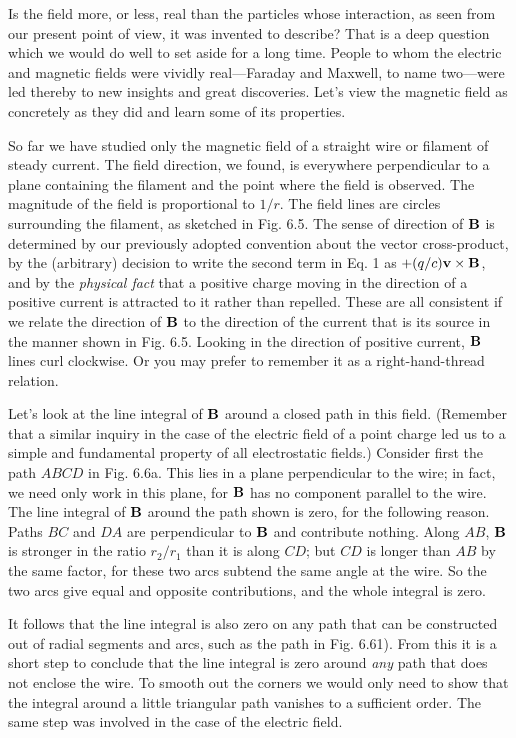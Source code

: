 Is the field more, or less, real than the particles whose interaction,
as seen from our present point of view, it was invented to describe?
That is a deep question which we would do well to set aside for a long
time. People to whom the electric and magnetic fields were vividly
real---Faraday and Maxwell, to name two---were led thereby to new
insights and great discoveries. Let's view the magnetic field as concretely
as they did and learn some of its properties.


So far we have studied only the magnetic field of a straight wire
or filament of steady current. The field direction, we found, is everywhere
perpendicular to a plane containing the filament and the point
where the field is observed. The magnitude of the field is proportional
to $1/r$. The field lines are circles surrounding the filament, as
sketched in Fig. 6.5. The sense of direction of $\mathbf{B}$ is determined by our
previously adopted convention about the vector cross-product, by
the (arbitrary) decision to write the second term in Eq. 1 as
$+ (q/c) \mathbf{v} \times \mathbf{B}$, and by the \emph{physical fact} that a positive charge moving
in the direction of a positive current is attracted to it rather than
repelled. These are all consistent if we relate the direction of $\mathbf{B}$ to
the direction of the current that is its source in the manner shown
in Fig. 6.5. Looking in the direction of positive current, $\mathbf{B}$ lines curl
clockwise. Or you may prefer to remember it as a right-hand-thread
relation.

Let's look at the line integral of $\mathbf{B}$ around a closed path in this field.
(Remember that a similar inquiry in the case of the electric field of
a point charge led us to a simple and fundamental property of all
electrostatic fields.) Consider first the path $ABCD$ in Fig. 6.6a. This
lies in a plane perpendicular to the wire; in fact, we need only work
in this plane, for $\mathbf{B}$ has no component parallel to the wire. The line
integral of $\mathbf{B}$ around the path shown is zero, for the following reason.
Paths $BC$ and $DA$ are perpendicular to $\mathbf{B}$ and contribute nothing.
Along $AB$, $\mathbf{B}$ is stronger in the ratio $r_2/r_1$ than it is along $CD$; but $CD$
is longer than $AB$ by the same factor, for these two arcs subtend the
same angle at the wire. So the two arcs give equal and opposite 
contributions, and the whole integral is zero.

It follows that the line integral is also zero on any path that can
be constructed out of radial segments and arcs, such as the path in
Fig. 6.61). From this it is a short step to conclude that the line integral
is zero around \emph{any} path that does not enclose the wire. To smooth
out the corners we would only need to show that the integral around
a little triangular path vanishes to a sufficient order. The same step
was involved in the case of the electric field.

